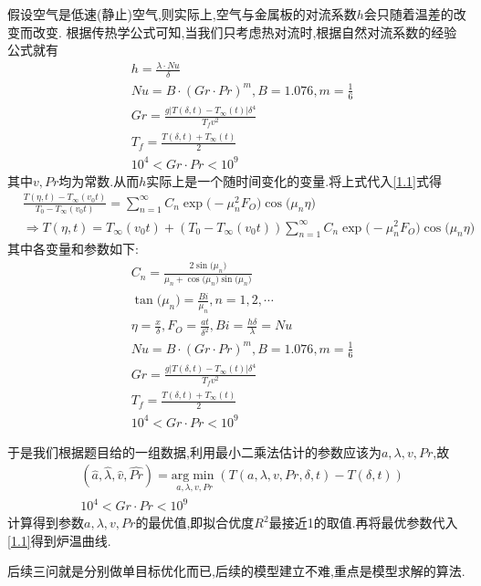 \documentclass[lang=cn,newtx,10pt,scheme=chinese]{../../Template/elegantbook}
\begin{document}
假设空气是低速(静止)空气,则实际上,空气与金属板的对流系数$h$会只随着温差的改变而改变.
根据传热学公式可知,当我们只考虑热对流时,根据自然对流系数的经验公式就有
\begin{align*}
&h=\frac{\lambda \cdot Nu}{\delta}
\\
&Nu=B \cdot \left( Gr\cdot Pr \right) ^{m},B=1.076,m=\frac{1}{6}
\\
&Gr=\frac{g\left| T\left( \delta,t \right) -T_{\infty}\left( t \right) \right|\delta ^4}{T_fv^2}
\\
&T_f=\frac{T\left( \delta,t \right) +T_{\infty}\left( t \right)}{2}
\\
&10^4<Gr\cdot Pr<10^9
\end{align*}
其中$v,Pr$均为常数.从而$h$实际上是一个随时间变化的变量.将上式代入\eqref{1.1}式得
\begin{align*}
&\frac{T(\eta ,t)-T_{\infty}\left( v_0t \right)}{T_0-T_{\infty}\left( v_0t \right)}=\sum_{n=1}^{\infty}{C_n\exp\mathrm{(}-\mu _{n}^{2}F_O)\cos\mathrm{(}\mu _n\eta )}
\\
&\Rightarrow T(\eta ,t)=T_{\infty}\left( v_0t \right) +\left( T_0-T_{\infty}\left( v_0t \right) \right) \sum_{n=1}^{\infty}{C_n\exp\mathrm{(}-\mu _{n}^{2}F_O)\cos\mathrm{(}\mu _n\eta )}
\end{align*}
其中各变量和参数如下:
\begin{align*}
&C_n=\frac{2\sin\mathrm{(}\mu _n)}{\mu _n+\cos\mathrm{(}\mu _n)\sin\mathrm{(}\mu _n)}
\\
&\tan\mathrm{(}\mu _n)=\frac{Bi}{\mu _n},n=1,2,\cdots 
\\
&\eta =\frac{x}{\delta},F_O=\frac{at}{\delta ^2},Bi=\frac{h\delta}{\lambda}=Nu
\\
&Nu=B \cdot \left( Gr\cdot Pr \right) ^{m},B=1.076,m=\frac{1}{6}
\\
&Gr=\frac{g\left| T\left( \delta,t \right) -T_{\infty}\left( t \right) \right|\delta ^4}{T_fv^2}
\\
&T_f=\frac{T\left( \delta,t \right) +T_{\infty}\left( t \right)}{2}
\\
&10^4<Gr\cdot Pr<10^9
\end{align*}

于是我们根据题目给的一组数据,利用最小二乘法估计的参数应该为$a,\lambda,v,Pr$,故
\begin{align*}
&\left( \widehat{a},\widehat{\lambda },\widehat{v},\widehat{Pr} \right) =\underset{a,\lambda ,v,Pr}{\mathrm{arg}\min}\left( T\left( a,\lambda ,v,Pr,\delta,t \right) -T\left( \delta,t \right) \right) 
\\
&10^4<Gr\cdot Pr<10^9
\end{align*}
计算得到参数$a,\lambda,v,Pr$的最优值,即拟合优度$R^2$最接近1的取值.再将最优参数代入\eqref{1.1}得到炉温曲线.

后续三问就是分别做单目标优化而已,后续的模型建立不难,重点是模型求解的算法.
\end{document}
